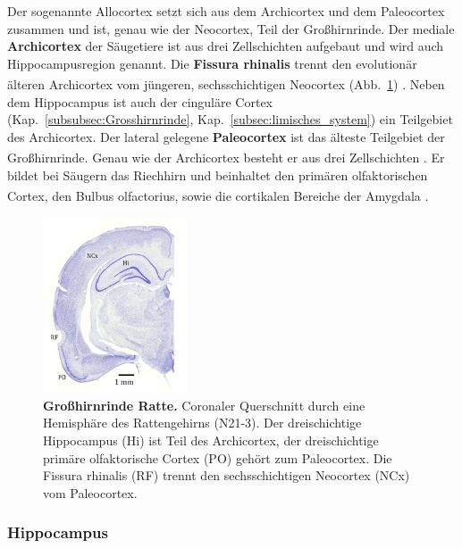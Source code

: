 Der sogenannte Allocortex setzt sich aus dem Archicortex und dem Paleocortex zusammen und ist, genau wie der Neocortex, Teil der Großhirnrinde. Der mediale \textbf{Archicortex} der Säugetiere ist aus drei Zellschichten aufgebaut und wird auch Hippocampusregion genannt. Die \textbf{Fissura rhinalis} trennt den evolutionär älteren Archicortex vom jüngeren, sechsschichtigen Neocortex (Abb.~\ref{fig:allocortex_ratte}) \textsuperscript{\cite[Kap.~6]{storch2012lehrbuchzoo}}. Neben dem Hippocampus ist auch der cinguläre Cortex (Kap.~\ref{subsubsec:Grosshirnrinde}, Kap.~\ref{subsec:limisches_system}) ein Teilgebiet des Archicortex. Der lateral gelegene \textbf{Paleocortex} ist das älteste Teilgebiet der Großhirnrinde. Genau wie der Archicortex besteht er aus drei Zellschichten \textsuperscript{\cite[Kap.~6]{storch2012lehrbuchzoo}}. Er bildet bei Säugern das Riechhirn und beinhaltet den primären olfaktorischen Cortex, den Bulbus olfactorius, sowie die cortikalen Bereiche der Amygdala \textsuperscript{\cite[Kap.~9]{trepel2011neuroanatomie}}.

\begin{figure}[H]
    \centering
    \includegraphics[width=0.38\textwidth]{pictures/Bilder_Jule/Ratte/RF.png}
    \caption[Großhirnrinde Ratte]{\textbf{Großhirnrinde Ratte.} Coronaler Querschnitt durch eine Hemisphäre des Rattengehirns (N21-3). Der dreischichtige Hippocampus (Hi) ist Teil des Archicortex, der dreischichtige primäre olfaktorische Cortex (PO) gehört zum Paleocortex. Die Fissura rhinalis (RF) trennt den sechsschichtigen Neocortex (NCx) vom Paleocortex.}
    \label{fig:allocortex_ratte}
\end{figure}{}

\subsubsection*{Hippocampus}
\label{subsubsec:Hippocampus} 

